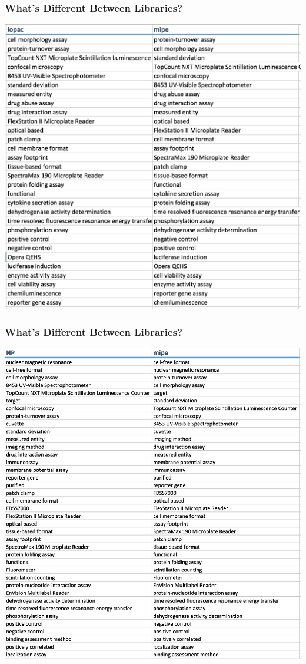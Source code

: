 \documentclass[anchorcolor=blue,linkcolor=blue]{beamer}
\begin{document}
  \begin{frame}
    \frametitle{What's Different Between Libraries?}
      \includegraphics[height=0.9\textheight]{img-diff-lopac-vs-mipe}      
  \end{frame}
  \begin{frame}
    \frametitle{What's Different Between Libraries?}
      \includegraphics[height=0.9\textheight]{img-diff-np-vs-mipe}      
  \end{frame}
\end{document}
